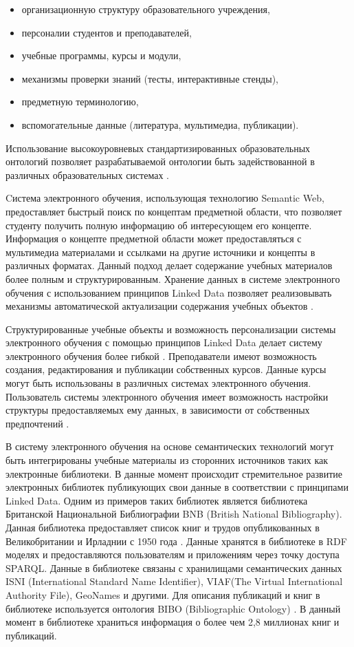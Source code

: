 \begin{itemize}
\item организационную структуру образовательного учреждения,
\item персоналии студентов и преподавателей,
\item учебные программы, курсы и модули,
\item механизмы проверки знаний (тесты, интерактивные стенды),
\item предметную терминологию,
\item вспомогательные данные (литература, мультимедиа, публикации).
\end{itemize}

Использование высокоуровневых стандартизированных образовательных онтологий позволяет разрабатываемой онтологии быть задействованной в различных образовательных системах \cite{bansal2012role}. 

Cистема электронного обучения, использующая технологию Semantic Web, предоставляет быстрый поиск по концептам предметной области, что позволяет студенту получить полную информацию об интересующем его концепте. Информация о концепте предметной области может предоставляться с мультимедиа материалами и ссылками на другие источники и концепты в различных форматах. Данный подход делает содержание учебных материалов более полным и структурированным. Хранение данных в системе электронного обучения с использованием принципов Linked Data позволяет реализовывать механизмы автоматической актуализации содержания учебных объектов \cite{mohan2003learning}. 

Структурированные учебные объекты и возможность персонализации системы электронного обучения с помощью принципов Linked Data делает систему электронного обучения более гибкой \cite{nilsson2002semantic}. Преподаватели имеют возможность создания, редактирования и публикации собственных курсов. Данные курсы могут быть использованы в различных системах электронного обучения. Пользователь системы электронного обучения имеет возможность настройки структуры предоставляемых ему данных, в зависимости от собственных предпочтений \cite{koper2004use}.  

В систему электронного обучения на основе семантических технологий могут быть интегрированы учебные материалы из сторонних источников таких как электронные библиотеки. В данные момент происходит стремительное развитие электронных библиотек публикующих свои данные в соответствии с принципами Linked Data. Одним из примеров таких библиотек является библиотека Британской Национальной Библиографии BNB (British National Bibliography). Данная библиотека предоставляет список книг и трудов опубликованных в Великобритании и Ирладнии с 1950 года \cite{danskin2012tags}. Данные хранятся в библиотеке в RDF моделях и предоставляются пользователям и приложениям через точку доступа SPARQL. Данные в библиотеке связаны с хранилищами семантических данных ISNI (International Standard Name Identifier), VIAF(The Virtual International Authority File), GeoNames и другими. Для описания публикаций и книг в библиотеке используется онтология BIBO (Bibliographic Ontology) \cite{park2014organizing}. В данный момент в библиотеке храниться информация о более чем 2,8 миллионах книг и публикаций.

